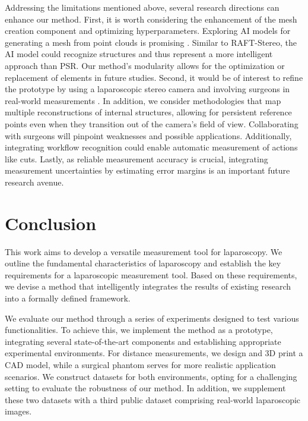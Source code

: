 \documentclass[letterpaper]{article} %
\begin{document}
Addressing the limitations mentioned above, several research directions can enhance our method. First, it is worth considering the enhancement of the mesh creation component and optimizing hyperparameters. Exploring AI models for generating a mesh from point clouds is promising \cite{Miyauchi2022}. Similar to RAFT-Stereo, the AI model could recognize structures and thus represent a more intelligent approach than PSR. Our method's modularity allows for the optimization or replacement of elements in future studies. Second, it would be of interest to refine the prototype by using a laparoscopic stereo camera and involving surgeons in real-world measurements \cite{Dowrick2023}. In addition, we consider methodologies that map multiple reconstructions of internal structures, allowing for persistent reference points even when they transition out of the camera's field of view. Collaborating with surgeons will pinpoint weaknesses and possible applications. Additionally, integrating workflow recognition could enable automatic measurement of actions like cuts. Lastly, as reliable measurement accuracy is crucial, integrating measurement uncertainties by estimating error margins is an important future research avenue. %

\section{Conclusion}

This work aims to develop a versatile measurement tool for laparoscopy. We outline the fundamental characteristics of laparoscopy and establish the key requirements for a laparoscopic measurement tool. Based on these requirements, we devise a method that intelligently integrates the results of existing research into a formally defined framework.

We evaluate our method through a series of experiments designed to test various functionalities. To achieve this, we implement the method as a prototype, integrating several state-of-the-art components and establishing appropriate experimental environments. For distance measurements, we design and 3D print a CAD model, while a surgical phantom serves for more realistic application scenarios. We construct datasets for both environments, opting for a challenging setting to evaluate the robustness of our method. In addition, we supplement these two datasets with a third public dataset comprising real-world laparoscopic images.
\end{document}
